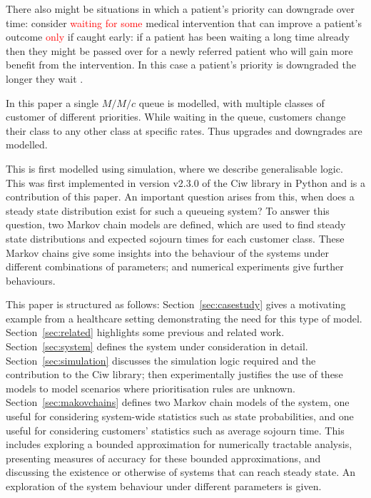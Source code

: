 \documentclass{article}
\begin{document}
There also might be situations in which a patient's priority can
downgrade over time: consider \textcolor{red}{waiting for some} medical
intervention that can improve a patient's outcome \textcolor{red}{only} if
caught early: if a patient has been waiting a long time
already then they might be passed over for a newly referred patient who will
gain more benefit from the intervention.
In this case a patient's priority is downgraded the longer they
wait \cite{dalessandro17}.


In this paper a single $M/M/c$ queue is modelled, with multiple classes of
customer of different priorities. While waiting in the queue, customers change
their class to any other class at specific rates.
Thus upgrades and downgrades are modelled.

This is first modelled using simulation, where we describe generalisable logic.
This was first implemented in version v2.3.0 of the Ciw library in Python
\cite{palmer19} and is a contribution of this paper.
An important question arises from this, when does a steady state distribution
exist for such a queueing system? To answer this question, two Markov chain
models are defined, which are used to find
steady state distributions and expected sojourn times for each customer class.
These Markov chains give some insights into the behaviour of the systems under
different combinations of parameters; and numerical experiments give further
behaviours.

This paper is structured as follows:
Section~\ref{sec:casestudy} gives a motivating example from a healthcare
setting demonstrating the need for this type of model.
Section~\ref{sec:related} highlights some previous and related work.
Section~\ref{sec:system} defines the system under consideration in detail.
Section~\ref{sec:simulation} discusses the simulation logic required and the
contribution to the Ciw library; then experimentally justifies the use of these
models to model scenarios where prioritisation rules are unknown.
Section~\ref{sec:makovchains} defines two Markov chain models of the system, one
useful for considering system-wide statistics such as state probabilities, and
one useful for considering customers' statistics such as average sojourn time.
This includes exploring a bounded approximation for numerically tractable
analysis, presenting measures of accuracy for these bounded approximations, and
discussing the existence or otherwise of systems that can reach steady state.
An exploration of the system behaviour under different parameters is given.
\end{document}
